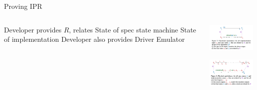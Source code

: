 \placelogofalse
\begin{frame}{Proving IPR}
  \begin{columns}
  \begin{outline}
    \1 Developer provides $R$, relates
    \2 State of spec state machine
    \2 State of implementation
    \1 Developer also provides
    \2 Driver
    \2 Emulator
  \end{outline}

  \begin{center}
    \includegraphics[width=4.5cm]{fig_7.png}

    \vspace{0.5cm}

    \includegraphics[width=4.5cm]{fig_8.png}

  \end{center}
  \end{columns}
\end{frame}
\placelogotrue
